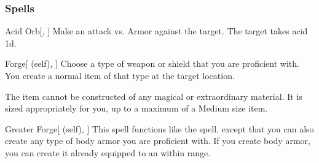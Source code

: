 \subsubsection{Spells}


\lowercase{\hypertarget{spell:Acid Orb}{}}\label{spell:Acid Orb}
\begin{freeability}[\nth{1}]{\hypertarget{spell:Acid Orb}{Acid Orb}}[, ]
Make an attack vs. Armor against the target.
\hit The target takes acid  \plus1d.
\end{freeability}
\vspace{0.25em}



\lowercase{\hypertarget{spell:Forge}{}}\label{spell:Forge}
\begin{attuneability}[\nth{1}]{\hypertarget{spell:Forge}{Forge}}[ (self), ]
Choose a type of weapon or shield that you are proficient with.
You create a normal item of that type at the target location.

The item cannot be constructed of any magical or extraordinary material.
It is sized appropriately for you, up to a maximum of a Medium size item.
\end{attuneability}
\vspace{0.25em}



\lowercase{\hypertarget{spell:Greater Forge}{}}\label{spell:Greater Forge}
\begin{attuneability}[\nth{2}]{\hypertarget{spell:Greater Forge}{Greater Forge}}[ (self), ]
This spell functions like the  spell, except that you can also create any type of body armor you are proficient with.
If you create body armor, you can create it already equipped to an  within range.
\end{attuneability}
\vspace{0.25em}



